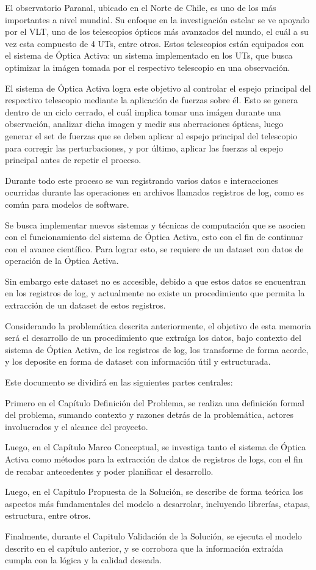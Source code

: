 
El observatorio Paranal, ubicado en el Norte de Chile, es uno de los más importantes a nivel mundial. Su enfoque en la investigación estelar se ve apoyado por el VLT, uno de los telescopios ópticos más avanzados del mundo, el cuál a su vez esta compuesto de 4 UTs, entre otros. Estos telescopios están equipados con el sistema de Óptica Activa: un sistema implementado en los UTs, que busca optimizar la imágen tomada por el respectivo telescopio en una observación.

El sistema de Óptica Activa logra este objetivo al controlar el espejo principal del respectivo telescopio mediante la aplicación de fuerzas sobre él. Esto se genera dentro de un ciclo cerrado, el cuál implica tomar una imágen durante una observación, analizar dicha imagen y medir sus aberraciones ópticas, luego generar el set de fuerzas que se deben aplicar al espejo principal del telescopio para corregir las perturbaciones, y por último, aplicar las fuerzas al espejo principal antes de repetir el proceso.

Durante todo este proceso se van registrando varios datos e interacciones ocurridas durante las operaciones en archivos llamados registros de log, como es común para modelos de software.

Se busca implementar nuevos sistemas y técnicas de computación que se asocien con el funcionamiento del sistema de Óptica Activa, esto con el fin de continuar con el avance científico. Para lograr esto, se requiere de un dataset con datos de operación de la Óptica Activa.

Sin embargo este dataset no es accesible, debido a que estos datos se encuentran en los registros de log, y actualmente no existe un procedimiento que permita la extracción de un dataset de estos registros.

Considerando la problemática descrita anteriormente, el objetivo de esta memoria será el desarrollo de un procedimiento que extraíga los datos, bajo contexto del sistema de Óptica Activa, de los registros de log, los transforme de forma acorde, y los deposite en forma de dataset con información útil y estructurada.

Este documento se dividirá en las siguientes partes centrales:

Primero en el Capítulo Definición del Problema, se realiza una definición formal del problema, sumando contexto y razones detrás de la problemática, actores involucrados y el alcance del proyecto.

Luego, en el Capítulo Marco Conceptual, se investiga tanto el sistema de Óptica Activa como métodos para la extracción de datos de registros de logs, con el fin de recabar antecedentes y poder planificar el desarrollo.

Luego, en el Capitulo Propuesta de la Solución, se describe de forma teórica los aspectos más fundamentales del modelo a desarrolar, incluyendo librerías, etapas, estructura, entre otros.

Finalmente, durante el Capitulo Validación de la Solución, se ejecuta el modelo descrito en el capítulo anterior, y se corrobora que la información extraída cumpla con la lógica y la calidad deseada.